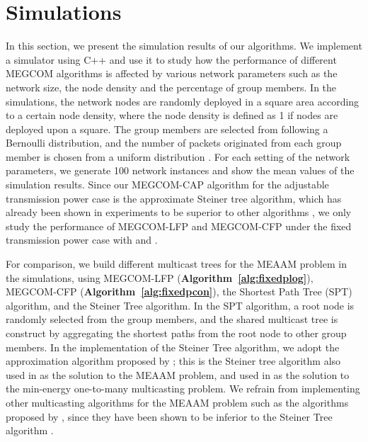 \documentclass[10pt, conference, compsocconf]{IEEEtran}
\begin{document}
\section{Simulations} \label{sec:sim}
In this section, we present the simulation results of our algorithms. We implement a simulator using C++ and use it to study how the performance of different MEGCOM algorithms is affected by various network parameters such as the network size, the node density and the percentage of group members. In the simulations, the network nodes are randomly deployed in a square area according to a certain node density, where the node density is defined as 1 if  nodes are deployed upon a  square. The group members are selected from  following a Bernoulli distribution, and the number of packets originated from each group member is chosen from a uniform distribution . For each setting of the network parameters, we generate 100 network instances and show the mean values of the simulation results. Since our MEGCOM-CAP algorithm for the adjustable transmission power case is the approximate Steiner tree algorithm, which has already been shown in experiments to be superior to other algorithms \cite{Liang2009}, we only study the performance of MEGCOM-LFP and MEGCOM-CFP under the fixed transmission power case with  and .

  For comparison, we build different multicast trees for the MEAAM problem in the simulations, using MEGCOM-LFP (\textbf{Algorithm~\ref{alg:fixedplog}}), MEGCOM-CFP (\textbf{Algorithm~\ref{alg:fixedpcon}}), the Shortest Path Tree (SPT) algorithm, and the Steiner Tree algorithm. In the SPT algorithm, a root node is randomly selected from the group members, and the shared multicast tree is construct by aggregating the shortest paths from the root node to other group members. In the implementation of the Steiner Tree algorithm, we adopt the approximation algorithm proposed by \cite{Kou1981}; this is the Steiner tree algorithm also used in \cite{Liang2009} as the solution to the MEAAM problem, and used in \cite{Wan2004} as the solution to the min-energy one-to-many multicasting problem. We refrain from implementing other multicasting algorithms for the MEAAM problem such as the algorithms proposed by \cite{Chiang1998,Ji1998}, since they have been shown to be inferior to the Steiner Tree algorithm \cite{Liang2009}.
\end{document}
